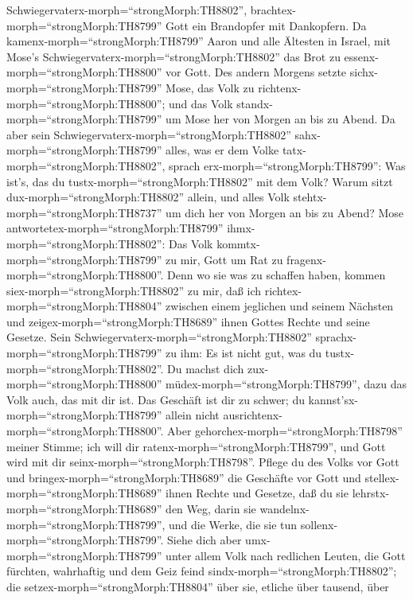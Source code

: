 Schwiegervaterx-morph=``strongMorph:TH8802'',
brachtex-morph=``strongMorph:TH8799'' Gott ein Brandopfer mit
Dankopfern. Da kamenx-morph=``strongMorph:TH8799'' Aaron und alle
Ältesten in Israel, mit Mose's
Schwiegervaterx-morph=``strongMorph:TH8802'' das Brot zu
essenx-morph=``strongMorph:TH8800'' vor Gott.  Des andern
Morgens setzte sichx-morph=``strongMorph:TH8799'' Mose, das Volk zu
richtenx-morph=``strongMorph:TH8800''; und das Volk
standx-morph=``strongMorph:TH8799'' um Mose her von Morgen an bis zu
Abend.  Da aber sein
Schwiegervaterx-morph=``strongMorph:TH8802''
sahx-morph=``strongMorph:TH8799'' alles, was er dem Volke
tatx-morph=``strongMorph:TH8802'', sprach
erx-morph=``strongMorph:TH8799'': Was ist's, das du
tustx-morph=``strongMorph:TH8802'' mit dem Volk? Warum sitzt
dux-morph=``strongMorph:TH8802'' allein, und alles Volk
stehtx-morph=``strongMorph:TH8737'' um dich her von Morgen an bis zu
Abend?  Mose antwortetex-morph=``strongMorph:TH8799''
ihmx-morph=``strongMorph:TH8802'': Das Volk
kommtx-morph=``strongMorph:TH8799'' zu mir, Gott um Rat zu
fragenx-morph=``strongMorph:TH8800''.  Denn wo sie was zu
schaffen haben, kommen siex-morph=``strongMorph:TH8802'' zu mir, daß ich
richtex-morph=``strongMorph:TH8804'' zwischen einem jeglichen und seinem
Nächsten und zeigex-morph=``strongMorph:TH8689'' ihnen Gottes Rechte und
seine Gesetze.  Sein
Schwiegervaterx-morph=``strongMorph:TH8802''
sprachx-morph=``strongMorph:TH8799'' zu ihm: Es ist nicht gut, was du
tustx-morph=``strongMorph:TH8802''.  Du machst dich
zux-morph=``strongMorph:TH8800'' müdex-morph=``strongMorph:TH8799'',
dazu das Volk auch, das mit dir ist. Das Geschäft ist dir zu schwer; du
kannst'sx-morph=``strongMorph:TH8799'' allein nicht
ausrichtenx-morph=``strongMorph:TH8800''.  Aber
gehorchex-morph=``strongMorph:TH8798'' meiner Stimme; ich will dir
ratenx-morph=``strongMorph:TH8799'', und Gott wird mit dir
seinx-morph=``strongMorph:TH8798''. Pflege du des Volks vor Gott und
bringex-morph=``strongMorph:TH8689'' die Geschäfte vor Gott
 und stellex-morph=``strongMorph:TH8689'' ihnen Rechte und
Gesetze, daß du sie lehrstx-morph=``strongMorph:TH8689'' den Weg, darin
sie wandelnx-morph=``strongMorph:TH8799'', und die Werke, die sie tun
sollenx-morph=``strongMorph:TH8799''.  Siehe dich aber
umx-morph=``strongMorph:TH8799'' unter allem Volk nach redlichen Leuten,
die Gott fürchten, wahrhaftig und dem Geiz feind
sindx-morph=``strongMorph:TH8802''; die
setzex-morph=``strongMorph:TH8804'' über sie, etliche über tausend, über
